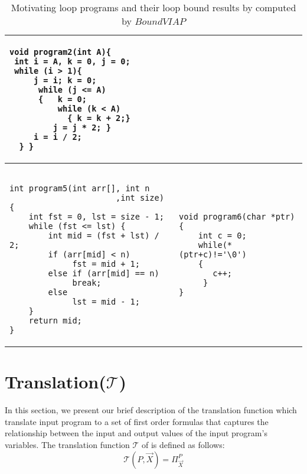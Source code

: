 \documentclass{article}
\begin{document}
\begin{table*}
\begin{tabular}{|p{2.4in}|p{2.2in}|}
\begin{subtable}{.2\textwidth}
\begin{minipage}{1in}
\begin{verbatim}
void program2(int A){
 int i = A, k = 0, j = 0;
 while (i > 1){    
     j = i; k = 0;
      while (j <= A)
      {   k = 0;
          while (k < A)
            { k = k + 2;}
         j = j * 2; }
     i = i / 2;
  } }
\end{verbatim}
\end{minipage}
\end{subtable}
\\\hline

\begin{subtable}{.2\textwidth}
\begin{minipage}{1in}
\begin{verbatim}

int program5(int arr[], int n
                      ,int size) {
    int fst = 0, lst = size - 1; 
    while (fst <= lst) { 
        int mid = (fst + lst) / 2;
        if (arr[mid] < n) 
             fst = mid + 1; 
        else if (arr[mid] == n) 
             break; 
        else 
             lst = mid - 1; 
    } 
    return mid; 
}
\end{verbatim}
\end{minipage}
\end{subtable}
&
\begin{subtable}{.2\textwidth}
\begin{minipage}{1in}
\begin{verbatim}
void program6(char *ptr){
    int c = 0;    
   	while(*(ptr+c)!='\0')
    {  
       c++;
     }
}
\end{verbatim}
\end{minipage}
\end{subtable}
\\\hline

\end{tabular}
\caption{Motivating loop programs and their loop bound results by computed by $BoundVIAP$} %
\label{table1}
\end{table*}



\section{Translation($\mathcal{T}$)}\label{translation}

In this section, we present our brief description of the translation function which translate input program to a set of first order formulas that captures the relationship between the input and output values of the input program's variables. The translation function $\mathcal{T}$ of is defined  as follows:
\[\mathcal{T}(P,\vec{X})=\Pi^{P}_{\vec{X}}\]
\end{document}
